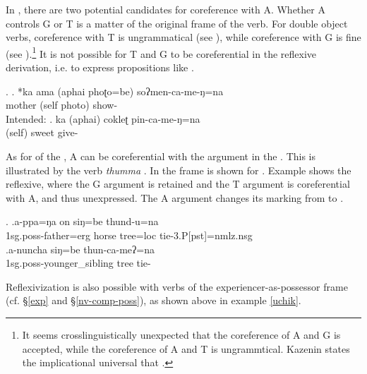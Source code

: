 In , there are two potential candidates for coreference with A. Whether A controls G or T is a matter of the original frame of the verb. For double object verbs, coreference with T is ungrammatical (see \Next[a]), while coreference with G is fine (see \Next[b]).\footnote{It seems crosslinguistically unexpected that the coreference of A and G is accepted, while the coreference of A and T is ungrammtical. Kazenin states the implicational universal that  \citep[918]{Kazenin2001_Verbal}. } It is not possible for T and G to be coreferential in the reflexive derivation, i.e. to express propositions like .

\ex. \ag. *ka ama (aphai phoʈo=be)  soʔmen-ca-me-ŋ=na\\
 mother (self photo) show- \\
Intended: 
	\bg. ka (aphai) cokleʈ pin-ca-me-ŋ=na\\
		 (self) sweet give-\\


As for  of the , A can be coreferential with the argument in the . This is illustrated by the verb \emph{thumma} .  In \Next[a] the  frame is shown for . Example \Next[b] shows the reflexive, where the  G argument is retained and the  T argument is coreferential with A, and thus unexpressed. The A argument changes its  marking from  to .  

\ex. \ag.a-ppa=ŋa on siŋ=be thund-u=na\\
		{\sc 1sg.poss}-father{\sc =erg} horse tree{\sc =loc} tie{\sc -3.P[pst]=nmlz.nsg}	\\
 	\bg.a-nuncha siŋ=be thun-ca-meʔ=na\\
{\sc 1sg.poss}-younger\_sibling tree tie-\\


Reflexivization is also possible with verbs of the experiencer-as-possessor frame (cf. §\ref{exp} and §\ref{nv-comp-poss}), as shown above in example \ref{uchik}.


